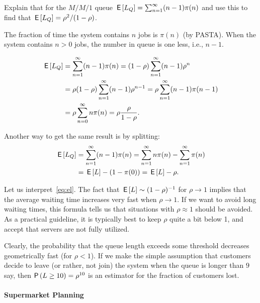 \begin{extra}
 Explain that for the $M/M/1$ queue $\,\mathsf{E}\left[L_Q\right] = \sum_{n=1}^\infty (n-1)\pi(n)$ and use this to find that $\,\mathsf{E}\left[L_Q\right]=\rho^2/(1-\rho)$.
\begin{solution}
 The fraction of time the system contains $n$ jobs is $\pi(n)$ (by
 PASTA). When the system contains $n>0$ jobs, the number in queue
 is one less, i.e., $n-1$.

 \begin{equation*}
 \begin{split}
\,\mathsf{E}\left[L_Q\right] 
&= \sum_{n=1}^\infty (n-1)\pi(n) 
= (1-\rho)\sum_{n=1}^\infty (n-1) \rho^n\\
&= \rho (1-\rho)\sum_{n=1}^\infty (n-1) \rho^{n-1}
= \rho \sum_{n=1}^\infty (n-1) \pi(n-1)\\
&= \rho \sum_{n=0}^\infty n \pi(n)
= \rho \frac{\rho}{1-\rho}.
 \end{split}
 \end{equation*}

Another way to get the same result is by splitting: 
\begin{equation*}
 \begin{split}
\,\mathsf{E}\left[L_Q\right] 
&= \sum_{n=1}^\infty (n-1)\pi(n) 
=\sum_{n=1}^\infty n\pi(n) -\sum_{n=1}^\infty \pi(n)\\
&= \,\mathsf{E}\left[L\right] - (1-\pi(0)) = \,\mathsf{E}\left[L\right] - \rho.
 \end{split}
\end{equation*}
\end{solution}
\end{extra}


Let us interpret~\cref{eq:el}.
The fact that $\,\mathsf{E}\left[L\right] \sim (1-\rho)^{-1}$ for $\rho\to 1$ implies that the average waiting time increases very fast when $\rho\to1$.
If we want to avoid long waiting times, this formula tells us that situations with $\rho\approx 1$ should be avoided.
As a practical guideline, it is typically best to keep $\rho$ quite a bit below 1, and accept that servers are not fully utilized.

Clearly, the probability that the queue length exceeds some threshold decreases geometrically fast (for $\rho<1$).
If we make the simple assumption that customers decide to leave (or rather, not join) the system when the queue is longer than $9$ say, then $\P{L\geq 10} = \rho^{10}$ is an estimator for the fraction of customers lost.


\paragraph{Supermarket Planning}

